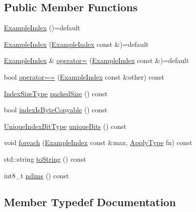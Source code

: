 \subsection*{Public Member Functions}
\begin{DoxyCompactItemize}
\item 
\hyperlink{structvt_1_1index_1_1_example_index_ae95bfbbb43c57658ebd5b15bdbb8dac0}{Example\+Index} ()=default
\item 
\hyperlink{structvt_1_1index_1_1_example_index_af4f0e1862469d47eb715ae553284d826}{Example\+Index} (\hyperlink{structvt_1_1index_1_1_example_index}{Example\+Index} const \&)=default
\item 
\hyperlink{structvt_1_1index_1_1_example_index}{Example\+Index} \& \hyperlink{structvt_1_1index_1_1_example_index_acaf68d730667b378a377bb2eabc53203}{operator=} (\hyperlink{structvt_1_1index_1_1_example_index}{Example\+Index} const \&)=default
\item 
bool \hyperlink{structvt_1_1index_1_1_example_index_ab473f0e55b054b4db5226b376357b5b1}{operator==} (\hyperlink{structvt_1_1index_1_1_example_index}{Example\+Index} const \&other) const
\item 
\hyperlink{structvt_1_1index_1_1_example_index_a19740d27aa6a911ec99a6f19f8cfdaab}{Index\+Size\+Type} \hyperlink{structvt_1_1index_1_1_example_index_a29fc62c72007ce1e4beae6e5109ea567}{packed\+Size} () const
\item 
bool \hyperlink{structvt_1_1index_1_1_example_index_a9d4dc66e352c419b6958b07c5c547fb2}{index\+Is\+Byte\+Copyable} () const
\item 
\hyperlink{namespacevt_a913e1f07b5228dd8bb64040dc6dcea14}{Unique\+Index\+Bit\+Type} \hyperlink{structvt_1_1index_1_1_example_index_abec47decec01c0eccdf3e2db1658a521}{unique\+Bits} () const
\item 
void \hyperlink{structvt_1_1index_1_1_example_index_afcee93f213e381a767210e35f7746462}{foreach} (\hyperlink{structvt_1_1index_1_1_example_index}{Example\+Index} const \&max, \hyperlink{structvt_1_1index_1_1_example_index_a7a5993e2e55fb1f80f59daa65ab7ead4}{Apply\+Type} fn) const
\item 
std\+::string \hyperlink{structvt_1_1index_1_1_example_index_affdc9729ea50c86b3c04a18dc69c396d}{to\+String} () const
\item 
int8\+\_\+t \hyperlink{structvt_1_1index_1_1_example_index_a95fa585991dc2fe785b63a37ba974d89}{ndims} () const
\end{DoxyCompactItemize}


\subsection{Member Typedef Documentation}
\mbox{\label{structvt_1_1index_1_1_example_index_a7a5993e2e55fb1f80f59daa65ab7ead4}} 
